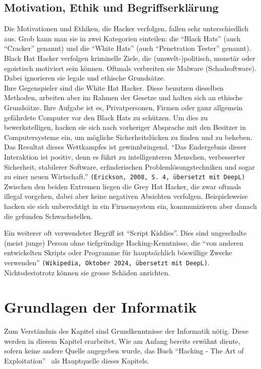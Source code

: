 \documentclass[11pt, a4paper]{article}
\begin{document}
\subsection{Motivation, Ethik und Begriffserklärung}
Die Motivationen und Ethiken, die Hacker verfolgen, fallen sehr unterschiedlich aus. Grob kann man sie in zwei Kategorien einteilen: die ``Black Hats'' (auch ``Cracker'' genannt) und die ``White Hats'' (auch ``Penetration Tester'' genannt). \\Black Hat Hacker verfolgen kriminelle Ziele, die (umwelt-)politisch, monetär oder egoistisch motiviert sein können. Oftmals verbreiten sie Malware (Schadsoftware). Dabei ignorieren sie legale und ethische Grundsätze. \\Ihre Gegenspieler sind die White Hat Hacker. Diese benutzen dieselben Methoden, arbeiten aber im Rahmen der Gesetze und halten sich an ethische Grundsätze. Ihre Aufgabe ist es, Privatpersonen, Firmen oder ganz allgemein gefährdete Computer vor den Black Hats zu schützen. Um dies zu bewerkstelligen, hacken sie sich nach vorheriger Absprache mit den Besitzer in Computersysteme ein, um mögliche Sicherheitslücken zu finden und zu beheben. \\ Das Resultat dieses Wettkampfes ist  gewinnbringend. ``Das Endergebnis dieser Interaktion ist positiv, denn es führt zu intelligenteren Menschen, verbesserter Sicherheit, stabilerer Software, erfinderischen Problemlösungstechniken und sogar zu einer neuen Wirtschaft.'' \texttt{(Erickson, 2008, S. 4, übersetzt mit DeepL)} \cite{erickson2008hacking}\\Zwischen den beiden Extremen liegen die Grey Hat Hacker, die zwar oftmals illegal vorgehen, dabei aber keine negativen Absichten verfolgen. Beispielsweise hacken sie sich unberechtigt in ein Firmensystem ein, kommunizieren aber danach die gefunden Schwachstellen. \cite{WhiteHatBlackHat:paper, BlackHat34:online}

Ein weiterer oft verwendeter Begriff ist ``Script Kiddies''. Dies sind ungeschulte (meist junge) Person ohne tiefgründige Hacking-Kenntnisse, die ``von anderen entwickelten Skripts oder Programme für hauptsächlich böswillige Zwecke verwenden'' \texttt{(Wikipedia, Oktober 2024, übersetzt mit DeepL)}. Nichtsdestotrotz können sie grosse Schäden anrichten. \cite{ScriptkiWikipedia:online}

\newpage
\section{Grundlagen der Informatik}\label{sec:grundlagen-der-informatik}
Zum Verständnis des Kapitel  sind Grundkenntnisse der Informatik nötig. Diese werden in diesem Kapitel erarbeitet. Wie am Anfang bereits erwähnt diente, sofern keine andere Quelle angegeben wurde, das Buch ``Hacking - The Art of Exploitation''~\cite{erickson2008hacking} als Hauptquelle dieses Kapitels.
\end{document}
